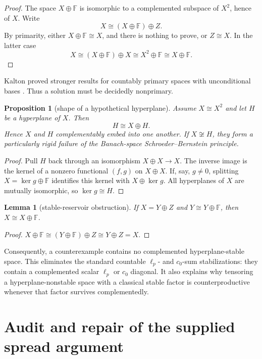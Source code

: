 \documentclass[11pt]{article}
\newtheorem{proposition}[theorem]{Proposition}
\newtheorem{lemma}[theorem]{Lemma}
\theoremstyle{definition}
\theoremstyle{remark}
\newcommand{\F}{\mathbb F}
\begin{document}
\begin{proof}
The space $X\oplus\F$ is isomorphic to a complemented subspace of $X^2$, hence
of $X$.  Write
\[
 X\cong (X\oplus\F)\oplus Z.
\]
By primarity, either $X\oplus\F\cong X$, and there is nothing to prove, or
$Z\cong X$.  In the latter case
\[
 X\cong(X\oplus\F)\oplus X\cong X^2\oplus\F\cong X\oplus\F.
\]
\end{proof}

Kalton proved stronger results for countably primary spaces with unconditional
bases \cite{Kalton1999}.  Thus a solution must be decidedly nonprimary.

\begin{proposition}[shape of a hypothetical hyperplane]\label{prop:hyperplane-shape}
Assume $X\cong X^2$ and let $H$ be a hyperplane of $X$.  Then
\[
 H\cong X\oplus H.
\]
Hence $X$ and $H$ complementably embed into one another.  If $X\not\cong H$,
they form a particularly rigid failure of the Banach-space
Schroeder--Bernstein principle.
\end{proposition}

\begin{proof}
Pull $H$ back through an isomorphism $X\oplus X\to X$.  The inverse image is
the kernel of a nonzero functional $(f,g)$ on $X\oplus X$.  If, say, $g\ne0$,
splitting $X=\ker g\oplus\F$ identifies this kernel with $X\oplus\ker g$.
All hyperplanes of $X$ are mutually isomorphic, so $\ker g\cong H$.
\end{proof}

\begin{lemma}[stable-reservoir obstruction]\label{lem:reservoir}
If $X=Y\oplus Z$ and $Y\cong Y\oplus\F$, then $X\cong X\oplus\F$.
\end{lemma}

\begin{proof}
$X\oplus\F\cong(Y\oplus\F)\oplus Z\cong Y\oplus Z=X$.
\end{proof}

Consequently, a counterexample contains no complemented hyperplane-stable
space.  This eliminates the standard countable $\ell_p$- and $c_0$-sum
stabilizations: they contain a complemented scalar $\ell_p$ or $c_0$ diagonal.
It also explains why tensoring a hyperplane-nonstable space with a classical
stable factor is counterproductive whenever that factor survives complementedly.

\section{Audit and repair of the supplied spread argument}
\end{document}
